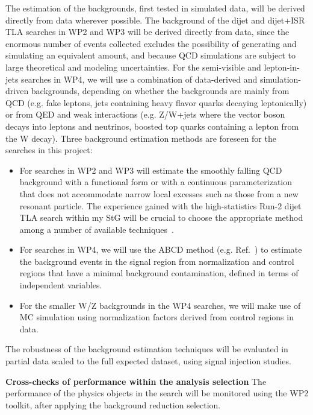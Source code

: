 The estimation of the backgrounds, first tested in simulated data, will be derived directly from data wherever possible. 
The background of the dijet and dijet+ISR TLA searches in WP2 and WP3 will be derived directly from data, since the enormous number of events collected excludes the possibility of generating and simulating an equivalent amount, and because QCD simulations are subject to large theoretical and modeling uncertainties.  
For the semi-visible and lepton-in-jets searches in WP4, we will use a combination of data-derived and simulation-driven backgrounds, depending on whether the backgrounds are mainly from QCD (e.g. fake leptons, jets containing heavy flavor quarks decaying leptonically) or from QED and weak interactions (e.g. Z/W+jets where the vector boson decays into leptons and neutrinos, boosted top quarks containing a lepton from the W decay). 
Three background estimation methods are foreseen for the searches in this project: 
\begin{itemize}
\item For searches in WP2 and WP3 will estimate the smoothly falling QCD background with a functional form or with a continuous parameterization that does not accommodate narrow local excesses such as those from a new resonant particle. The experience gained with the high-statistics Run-2 dijet TLA search within my StG will be crucial to choose the appropriate method among a number of available techniques~\cite{ToBeCited}. %
\item For searches in WP4, we will use the ABCD method (e.g. Ref.~\cite{ToBeCited}) %
to estimate the background events in the signal region from normalization and control regions that have a minimal background contamination, defined in terms of independent variables. 
\item For the smaller W/Z backgrounds in the WP4 searches, we will make use of MC simulation using normalization factors derived from control regions in data. 
\end{itemize}
The robustness of the background estimation techniques will be evaluated in partial data scaled to the full expected dataset, using signal injection studies. 

\textbf{Cross-checks of performance within the analysis selection} The performance of the physics objects in the search will be monitored using the WP2 toolkit, after applying the background reduction selection. 

